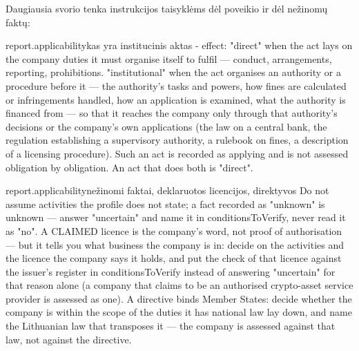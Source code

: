 Daugiausia svorio tenka instrukcijos taisyklėms dėl poveikio ir dėl nežinomų faktų:

\begin{promptexcerpt}{report.applicability}{kas yra institucinis aktas}
  - effect: "direct" when the act lays on the company duties it must organise itself
    to fulfil — conduct, arrangements, reporting, prohibitions. "institutional" when
    the act organises an authority or a procedure before it — the authority's tasks
    and powers, how fines are calculated or infringements handled, how an application
    is examined, what the authority is financed from — so that it reaches the company
    only through that authority's decisions or the company's own applications (the
    law on a central bank, the regulation establishing a supervisory authority, a
    rulebook on fines, a description of a licensing procedure). Such an act is
    recorded as applying and is not assessed obligation by obligation. An act that
    does both is "direct".
\end{promptexcerpt}

\begin{promptexcerpt}{report.applicability}{nežinomi faktai, deklaruotos licencijos, direktyvos}
  Do not assume activities the profile does not state; a fact recorded as
  "unknown" is unknown — answer "uncertain" and name it in conditionsToVerify,
  never read it as "no". A CLAIMED licence is the company's word, not proof of
  authorisation — but it tells you what business the company is in: decide on
  the activities and the licence the company says it holds, and put the check of
  that licence against the issuer's register in conditionsToVerify instead of
  answering "uncertain" for that reason alone (a company that claims to be an
  authorised crypto-asset service provider is assessed as one). A directive binds
  Member States: decide whether the company is within the scope of the duties it has
  national law lay down, and name the Lithuanian law that transposes it — the company
  is assessed against that law, not against the directive.
\end{promptexcerpt}

